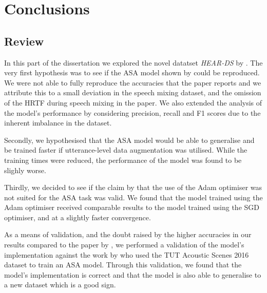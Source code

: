 \documentclass[logo,bsc,singlespacing,parskip,online]{infthesis}
\newcommand{\heards}{\textit{HEAR-DS}\xspace}
\begin{document}





\chapter{Conclusions}
\label{chap:conclusions}
\section{Review}
In this part of the dissertation we explored the novel datatset \heards by \citet{Huwel2020HearDS}.
The very first hypothesis was to see if the ASA model shown by \citet{Huwel2020HearDS} 
could be reproduced. We were not able to fully reproduce the accuracies that the paper 
reports and we attribute this to a small deviation
in the speech mixing dataset, and the omission of 
the HRTF during speech mixing in the paper. We also 
extended the analysis of the model's performance 
by considering precision, recall and F1 scores 
due to the inherent imbalance in the dataset.

Secondly, we hypothesised that the ASA model 
would be able to generalise and be trained 
faster if utterance-level data augmentation was utilised. 
While the training times were reduced, the performance 
of the model was found to be slighly worse. 

Thirdly, we decided to see if the claim by \citet{Huwel2020HearDS} 
that the use of the Adam optimiser was not suited 
for the ASA task was valid. We found that the model 
trained using the Adam optimiser received 
comparable results to the model trained using the 
SGD optimiser, and at a slightly faster convergence.

As a means of validation, and the doubt raised 
by the higher accuracies in our results compared 
to the paper by \citet{Huwel2020HearDS}, we 
performed a validation of the model's implementation
against the work by \citet{schindler_multi-temporal_2018} 
who used the TUT Acoustic Scenes 2016 dataset to 
train an ASA model. Through this validation, we 
found that the model's implementation is correct 
and that the model is also able to generalise to 
a new dataset which is a good sign.
\end{document}

